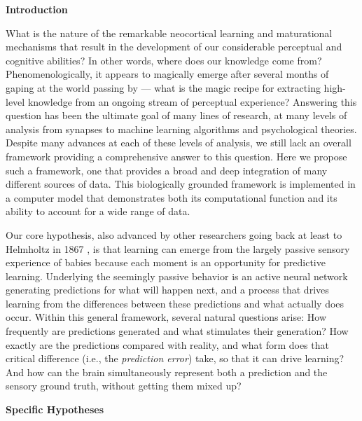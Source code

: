 \documentclass[10pt,twocolumn]{article}
\newif\myifpdf
\begin{document}
\begin{center}
\textbf{Introduction}
\end{center}

What is the nature of the remarkable neocortical learning and maturational mechanisms that result in the development of our considerable perceptual and cognitive abilities? In other words, where does our knowledge come from? Phenomenologically, it appears to magically emerge after several months of gaping at the world passing by --- what is the magic recipe for extracting high-level knowledge from an ongoing stream of perceptual experience? Answering this question has been the ultimate goal of many lines of research, at many levels of analysis from synapses to machine learning algorithms and psychological theories. Despite many advances at each of these levels of analysis, we still lack an overall framework providing a comprehensive answer to this question. Here we propose such a framework, one that provides a broad and deep integration of many different sources of data. This biologically grounded framework is implemented in a computer model that demonstrates both its computational function and its ability to account for a wide range of data.

Our core hypothesis, also advanced by other researchers going back at least to Helmholtz in 1867 \cite{Helmholtz13}, is that learning can emerge from the largely passive sensory experience of babies because each moment is an opportunity for predictive learning. Underlying the seemingly passive behavior is an active neural network generating predictions for what will happen next, and a process that drives learning from the differences between these predictions and what actually does occur. Within this general framework, several natural questions arise: How frequently are predictions generated and what stimulates their generation?  How exactly are the predictions compared with reality, and what form does that critical difference (i.e., the {\em prediction error}) take, so that it can drive learning?  And how can the brain simultaneously represent both a prediction and the sensory ground truth, without getting them mixed up? 

\begin{center}
\textbf{Specific Hypotheses}
\end{center}
\end{document}
